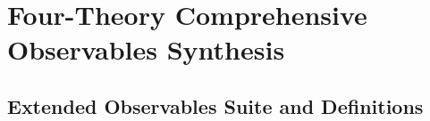 \chapter{Four-Theory Comprehensive Observables Synthesis}
\label{ch:phase4_observables}

\section{Extended Observables Suite and Definitions}
\label{sec:phase4_obs_definitions}

